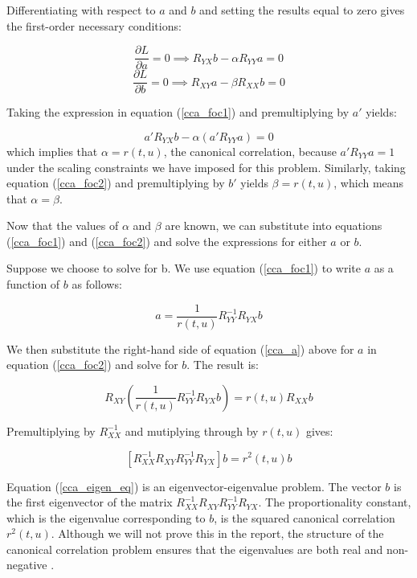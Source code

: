 Differentiating with respect to $a$ and $b$ and setting the results equal to zero gives the first-order necessary conditions:

\begin{equation}
\label{cca_foc1}
  \frac{\partial L}{\partial a} = 0 \implies R_{YX}b - \alpha R_{YY}a = 0
\end{equation}
\begin{equation}
\label{cca_foc2}
 \frac{\partial L}{\partial b} = 0 \implies R_{XY}a - \beta R_{XX}b = 0
\end{equation}

Taking the expression in equation (\ref{cca_foc1}) and premultiplying by $a'$ yields:

$$a'R_{YX}b - \alpha (a'R_{YY}a) = 0$$
which implies that $\alpha = r(t,u) $, the canonical correlation, because $a'R_{YY}a=1$ under the scaling constraints we have imposed for this problem. Similarly, taking equation (\ref{cca_foc2}) and premultiplying by $b'$ yields $\beta = r(t,u)$, which means that $\alpha = \beta$.

Now that the values of $\alpha$ and $\beta$ are known, we can substitute into equations (\ref{cca_foc1}) and (\ref{cca_foc2}) and solve the expressions for either $a$ or $b$.

Suppose we choose to solve for b. We use equation (\ref{cca_foc1}) to write $a$ as a function of $b$ as follows:

\begin{equation}
\label{cca_a}
  a = \frac{1}{r(t,u)}R^{-1}_{YY}R_{YX}b
\end{equation}

We then substitute the right-hand side of equation (\ref{cca_a}) above for $a$ in equation (\ref{cca_foc2}) and solve for $b$. The result is:

\begin{equation}
 R_{XY}\left( \frac{1}{r(t,u)}R^{-1}_{YY}R_{YX}b \right) = r(t,u)R_{XX}b
\end{equation}

Premultiplying by $R^{-1}_{XX}$ and mutiplying through by $r(t,u)$ gives:

\begin{equation}
  \label{cca_eigen_eq}
 [R^{-1}_{XX}R_{XY}R^{-1}_{YY}R_{YX}]b = r^2(t,u)b
\end{equation}

Equation (\ref{cca_eigen_eq}) is an eigenvector-eigenvalue problem. The vector $b$ is the first eigenvector of the matrix $R^{-1}_{XX}R_{XY}R^{-1}_{YY}R_{YX}$. The proportionality constant, which is the eigenvalue corresponding to $b$, is the squared canonical correlation $r^2(t,u)$. Although we will not prove this in the report, the structure of the canonical correlation problem ensures that the eigenvalues are both real and non-negative \cite{carroll1997mathematical}. 

